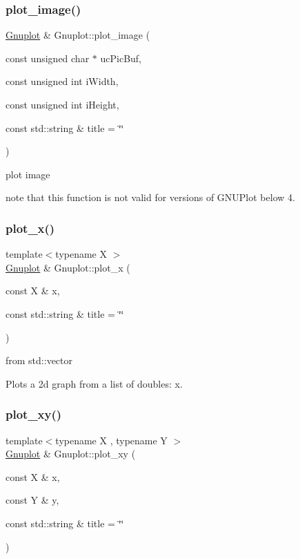 \subsubsection{\texorpdfstring{plot\+\_\+image()}{plot\_image()}}
{\footnotesize\ttfamily \hyperlink{class_gnuplot}{Gnuplot} \& Gnuplot\+::plot\+\_\+image (\begin{DoxyParamCaption}\item[{const unsigned char $\ast$}]{uc\+Pic\+Buf,  }\item[{const unsigned int}]{i\+Width,  }\item[{const unsigned int}]{i\+Height,  }\item[{const std\+::string \&}]{title = {\ttfamily \char`\"{}\char`\"{}} }\end{DoxyParamCaption})}



plot image 


\begin{DoxyItemize}
\item note that this function is not valid for versions of G\+N\+U\+Plot below 4. 
\end{DoxyItemize}\mbox{\label{class_gnuplot_a80f3b2baae2bceff78ad005d9c3ec3fb}} 
\subsubsection{\texorpdfstring{plot\+\_\+x()}{plot\_x()}}
{\footnotesize\ttfamily template$<$typename X $>$ \\
\hyperlink{class_gnuplot}{Gnuplot} \& Gnuplot\+::plot\+\_\+x (\begin{DoxyParamCaption}\item[{const X \&}]{x,  }\item[{const std\+::string \&}]{title = {\ttfamily \char`\"{}\char`\"{}} }\end{DoxyParamCaption})}



from std\+::vector 

Plots a 2d graph from a list of doubles\+: x. \mbox{\label{class_gnuplot_a0514a7391de6b42e79732ce746c310f7}} 
\subsubsection{\texorpdfstring{plot\+\_\+xy()}{plot\_xy()}}
{\footnotesize\ttfamily template$<$typename X , typename Y $>$ \\
\hyperlink{class_gnuplot}{Gnuplot} \& Gnuplot\+::plot\+\_\+xy (\begin{DoxyParamCaption}\item[{const X \&}]{x,  }\item[{const Y \&}]{y,  }\item[{const std\+::string \&}]{title = {\ttfamily \char`\"{}\char`\"{}} }\end{DoxyParamCaption})}



